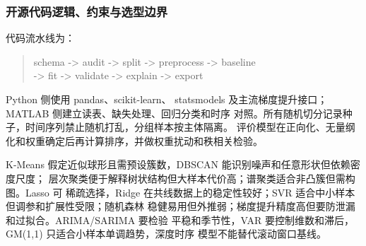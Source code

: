 \subsubsection{开源代码逻辑、约束与选型边界}

代码流水线为：
\begin{quote}
\small\ttfamily
schema -> audit -> split -> preprocess -> baseline\\
-> fit -> validate -> explain -> export
\end{quote}
Python 侧使用 pandas、scikit-learn、
statsmodels 及主流梯度提升接口；MATLAB 侧建立读表、缺失处理、回归分类和时序
对照。所有随机切分记录种子，时间序列禁止随机打乱，分组样本按主体隔离。
评价模型在正向化、无量纲化和权重确定后再计算排序，并做权重扰动和秩相关检验。

K-Means 假定近似球形且需预设簇数，DBSCAN 能识别噪声和任意形状但依赖密度尺度；
层次聚类便于解释树状结构但大样本代价高；谱聚类适合非凸簇但需构图。Lasso 可
稀疏选择，Ridge 在共线数据上的稳定性较好；SVR 适合中小样本但调参和扩展性受限；随机森林
稳健易用但外推弱；梯度提升精度高但要防泄漏和过拟合。ARIMA/SARIMA 要检验
平稳和季节性，VAR 要控制维数和滞后，GM(1,1) 只适合小样本单调趋势，深度时序
模型不能替代滚动窗口基线。

